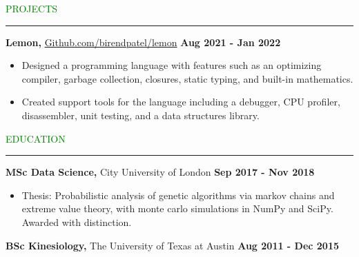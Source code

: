 \documentclass [
        11pt
] {article}
\begin{document}
\noindent\textcolor{green}{PROJECTS \rule{16cm}{1pt}}

\vspace*{10pt}

\noindent \textbf {Lemon,} \href{https://github.com/birendpatel/lemon}{Github.com/birendpatel/lemon}
\hspace*{\fill} \textbf{Aug 2021 - Jan 2022}

\begin{itemize}[noitemsep,topsep=0pt]
\renewcommand{\labelitemi}{\scriptsize$\blacksquare$}

\item Designed a programming language with features such as an optimizing
compiler, garbage collection, closures, static typing, and built-in
mathematics.

\vspace*{5pt}

\item Created support tools for the language including a debugger, CPU profiler,
disassembler, unit testing, and a data structures library.

\end{itemize}

\vspace*{10pt}


\noindent\textcolor{green}{EDUCATION \rule{16cm}{1pt}}

\vspace*{10pt}

\noindent \textbf {MSc Data Science,} City University of London
\hspace*{\fill} \textbf{Sep 2017 - Nov 2018}

\begin{itemize}[noitemsep,topsep=0pt]
\renewcommand{\labelitemi}{\scriptsize$\blacksquare$}
\item Thesis: Probabilistic analysis of genetic algorithms via markov chains
and extreme value theory, with monte carlo simulations in NumPy and SciPy.
Awarded with distinction.
\end{itemize}

\noindent \textbf {BSc Kinesiology,} The University of Texas at Austin
\hspace*{\fill} \textbf{Aug 2011 - Dec 2015}
\end{document}
